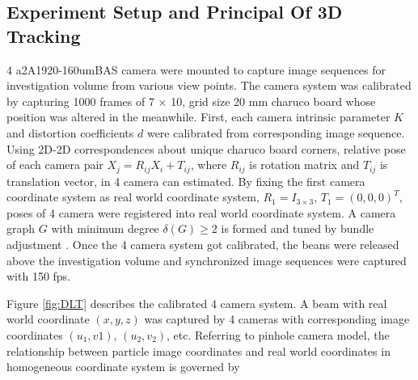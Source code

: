 \documentclass[draftthesis,fullpage]{uiucthesis}
\begin{document}
\subsection*{Experiment Setup and Principal Of 3D Tracking}
4 a2A1920-160umBAS camera were mounted to capture image sequences for investigation volume from various view points. The camera system was calibrated by capturing 1000 frames of 7 $\times$ 10, grid size 20 mm charuco board whose position was altered in the meanwhile. First, each camera intrinsic parameter $K$ and distortion coefficients $d$ were calibrated from corresponding image sequence.
Using 2D-2D correspondences about unique charuco board corners, relative pose of each camera pair $X_j = R_{ij}X_i + T_{ij}$, where $R_{ij}$ is rotation matrix and $T_{ij}$ is translation vector, in 4 camera can estimated. By fixing the first camera coordinate system as real world coordinate system, $R_1 = I_{3 \times 3}$, $T_1 = (0,0,0)^T$, poses of 4 camera were registered into real world coordinate system. A camera graph $G$ with minimum degree $\delta (G) \geq 2$ is formed and tuned by bundle adjustment \citep{engels2006bundle}.   
Once the 4 camera system got calibrated, the beans were released above the investigation volume and synchronized image sequences were captured with 150 fps.

Figure \ref{fig:DLT} describes the calibrated 4 camera system. A beam with real world coordinate $(x,y,z)$ was captured by 4 cameras with corresponding image coordinates $(u_1,v1)$, $(u_2,v_2)$, etc. Referring to pinhole camera model, the relationship between particle image coordinates and real world coordinates in homogeneous coordinate system is governed by 
\end{document}
